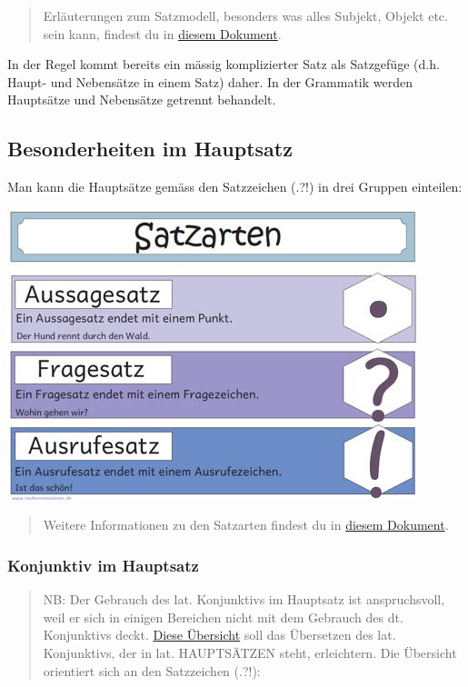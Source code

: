 \documentclass{scrartcl}
\begin{document}
\begin{quote}
Erläuterungen zum Satzmodell, besonders was alles Subjekt, Objekt
etc. sein kann, findest du in \href{https://www.dropbox.com/s/id081k5itrib85b/Z19\_Satzmodell.pdf?dl=0}{diesem Dokument}.
\end{quote}

In der Regel kommt bereits ein mässig komplizierter Satz als
Satzgefüge (d.h. Haupt- und Nebensätze in einem Satz) daher. In der
Grammatik werden Hauptsätze und Nebensätze getrennt behandelt.

\subsection{Besonderheiten im Hauptsatz}
\label{sec:org624c3b8}

Man kann die Hauptsätze gemäss den Satzzeichen (.?!) in drei Gruppen
einteilen:

\begin{center}
\includegraphics[width=.9\linewidth]{satzarten.jpg}
\label{org8b30e2e}
\end{center}

\begin{quote}
Weitere Informationen zu den Satzarten findest du in \href{https://www.dropbox.com/s/fskiu3e5rj485xp/Satzgrammatik.pdf?dl=0}{diesem Dokument}.
\end{quote}

\subsubsection{Konjunktiv im Hauptsatz}
\label{sec:orge996208}

\begin{quote}
NB: Der Gebrauch des lat. Konjunktivs im Hauptsatz ist anspruchsvoll,
weil er sich in einigen Bereichen nicht mit dem Gebrauch des
dt. Konjunktivs deckt. \href{https://www.dropbox.com/s/k03cq5ysu5of1ha/KonjunktivHS.pdf?dl=0}{Diese Übersicht} soll das Übersetzen des
lat. Konjunktivs, der in lat. HAUPTSÄTZEN steht, erleichtern. Die
Übersicht orientiert sich an den Satzzeichen (.?!):
\end{quote}
\end{document}
